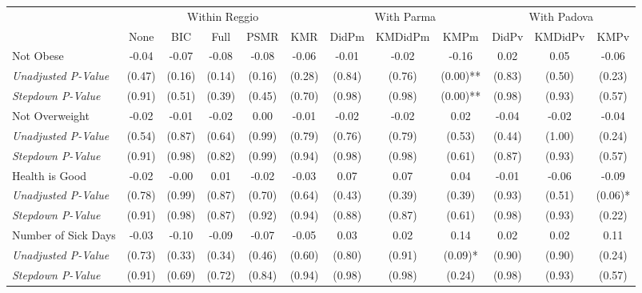 \begin{tabular}{l c c c c c c c c c c c}
\toprule
& \multicolumn{5}{c}{Within Reggio} & \multicolumn{3}{c}{With Parma} & \multicolumn{3}{c}{With Padova} \\\cmidrule(lr){2-6} \cmidrule(lr){7-9} \cmidrule(lr){10-12}
 & None & BIC & Full & PSMR & KMR & DidPm & KMDidPm & KMPm & DidPv & KMDidPv & KMPv \\
\midrule
Not Obese & -0.04 & -0.07 & -0.08 & -0.08 & -0.06 & -0.01 & -0.02 & -0.16 & 0.02 & 0.05 & -0.06 \\
\quad \textit{Unadjusted P-Value} & (0.47) & (0.16) & (0.14) & (0.16) & (0.28) & (0.84) & (0.76) & (0.00)** & (0.83) & (0.50) & (0.23) \\
\quad \textit{Stepdown P-Value} & (0.91) & (0.51) & (0.39) & (0.45) & (0.70) & (0.98) & (0.98) & (0.00)** & (0.98) & (0.93) & (0.57) \\
Not Overweight & -0.02 & -0.01 & -0.02 & 0.00 & -0.01 & -0.02 & -0.02 & 0.02 & -0.04 & -0.02 & -0.04 \\
\quad \textit{Unadjusted P-Value} & (0.54) & (0.87) & (0.64) & (0.99) & (0.79) & (0.76) & (0.79) & (0.53) & (0.44) & (1.00) & (0.24) \\
\quad \textit{Stepdown P-Value} & (0.91) & (0.98) & (0.82) & (0.99) & (0.94) & (0.98) & (0.98) & (0.61) & (0.87) & (0.93) & (0.57) \\
Health is Good & -0.02 & -0.00 & 0.01 & -0.02 & -0.03 & 0.07 & 0.07 & 0.04 & -0.01 & -0.06 & -0.09 \\
\quad \textit{Unadjusted P-Value} & (0.78) & (0.99) & (0.87) & (0.70) & (0.64) & (0.43) & (0.39) & (0.39) & (0.93) & (0.51) & (0.06)* \\
\quad \textit{Stepdown P-Value} & (0.91) & (0.98) & (0.87) & (0.92) & (0.94) & (0.88) & (0.87) & (0.61) & (0.98) & (0.93) & (0.22) \\
Number of Sick Days & -0.03 & -0.10 & -0.09 & -0.07 & -0.05 & 0.03 & 0.02 & 0.14 & 0.02 & 0.02 & 0.11 \\
\quad \textit{Unadjusted P-Value} & (0.73) & (0.33) & (0.34) & (0.46) & (0.60) & (0.80) & (0.91) & (0.09)* & (0.90) & (0.90) & (0.24) \\
\quad \textit{Stepdown P-Value} & (0.91) & (0.69) & (0.72) & (0.84) & (0.94) & (0.98) & (0.98) & (0.24) & (0.98) & (0.93) & (0.57) \\
\bottomrule
\end{tabular}
